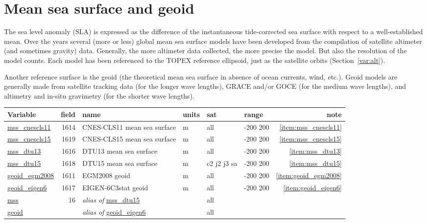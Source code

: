 \documentclass[a4paper,11pt,openany,natbib,nomargin]{thesis}
\makeatletter
\newcommand\var[1]{\url{#1}\index{variables!#1@\protect\url{#1}}}
\newcommand\alias[1]{\emph{alias of} \var{#1}}
\newenvironment{vartable}{
\begin{table}[ht]
\small
\begin{tabular}{lrllllr}
\hline
Variable & field & name & units & sat & range & note \\
\hline
}{
\hline
\end{tabular}
\end{table}
}
\makeatother
\begin{document}
\section{Mean sea surface and geoid}
\label{var:geoid}\label{var:mss}
The sea level anomaly (SLA) is expressed as the difference of the instantaneous tide-corrected sea surface with respect to a well-established mean. Over the years several (more or less) global mean sea surface models have been developed from the compilation of satellite altimeter (and sometimes gravity) data. Generally, the more altimeter data collected, the more precise the model. But also the resolution of the model counts. Each model has been referenced to the TOPEX reference ellipsoid, just as the satellite orbits (Section~\ref{var:alt}).

Another reference surface is the geoid (the theoretical mean sea surface in absence of ocean currents, wind, etc.). Geoid models are generally made from satellite tracking data (for the longer wave lengths), GRACE and/or GOCE (for the medium wave lengths), and altimetry and in-situ gravimetry (for the shorter wave lengths).

\begin{vartable}
\var{mss_cnescls11} & 1614 & CNES-CLS11 mean sea surface & m & all & -200 200 & \ref{item:mss_cnescls11} \\
\var{mss_cnescls15} & 1619 & CNES-CLS15 mean sea surface & m & all & -200 200 & \ref{item:mss_cnescls15} \\
\var{mss_dtu13} & 1616 & DTU13 mean sea surface & m & all & -200 200 & \ref{item:mss_dtu13} \\
\var{mss_dtu15} & 1618 & DTU15 mean sea surface & m & c2 j2 j3 sa & -200 200 & \ref{item:mss_dtu15} \\
\var{geoid_egm2008} & 1611 & EGM2008 geoid & m & all & -200 200 & \ref{item:geoid_egm2008} \\
\var{geoid_eigen6} & 1617 & EIGEN-6C3stat geoid & m & all & -200 200 & \ref{item:geoid_eigen6} \\
\hline
\var{mss} & 16 & \alias{mss_dtu15} && all && \\
\var{geoid} && \alias{geoid_eigen6} && all && \\
\end{vartable}
\end{document}

